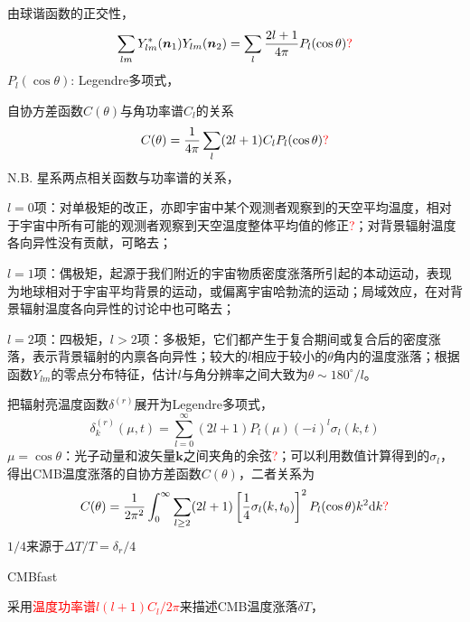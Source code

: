 \documentclass[12pt,a4paper]{article}
\renewcommand{\vec}[1]{\boldsymbol{#1}}
\newcommand{\dif}{\mathrm{d}}
\begin{document}
由球谐函数的正交性，
\begin{equation}
\sum_{lm} Y^*_{lm}(\vec{n}_1) Y_{lm}(\vec{n}_2) = \sum_l \frac{2l+1}{4\pi} P_l (\cos \theta)\textcolor{red}{?}
\end{equation}
$P_l (\cos \theta)$: Legendre多项式，

自协方差函数$C(\theta)$与角功率谱$C_l$的关系
\begin{equation}
C(\theta) = \frac{1}{4\pi} \sum_l (2l+1) C_l P_l (\cos \theta)\textcolor{red}{?}
\end{equation}
N.B. 星系两点相关函数与功率谱的关系，

$l=0$项：对单极矩的改正，亦即宇宙中某个观测者观察到的天空平均温度，相对于宇宙中所有可能的观测者观察到天空温度整体平均值的修正\textcolor{red}{?}；对背景辐射温度各向异性没有贡献，可略去；

$l=1$项：偶极矩，起源于我们附近的宇宙物质密度涨落所引起的本动运动，表现为地球相对于宇宙平均背景的运动，或偏离宇宙哈勃流的运动；局域效应，在对背景辐射温度各向异性的讨论中也可略去；

$l=2$项：四极矩，$l>2$项：多极矩，它们都产生于复合期间或复合后的密度涨落，表示背景辐射的内禀各向异性；较大的$l$相应于较小的$\theta$角内的温度涨落；根据函数$Y_{lm}$的零点分布特征，估计$l$与角分辨率之间大致为$\theta \sim 180^{\circ}/l$。

把辐射亮温度函数$\delta^{(r)}$展开为Legendre多项式，
\begin{equation}
\delta_k^{(r)}(\mu, t) = \sum_{l=0}^{\infty} (2l +1) P_l(\mu) (-i)^l \sigma_l(k, t)
\end{equation}
$\mu = \cos \theta$：光子动量和波矢量$\vec{k}$之间夹角的余弦\textcolor{red}{?}；可以利用数值计算得到的$\sigma_l$，得出CMB温度涨落的自协方差函数$C(\theta)$，二者关系为
\begin{equation}
C(\theta) = \frac{1}{2\pi^2} \int_0^{\infty} \sum_{l \geq 2}(2l +1) \left[\frac{1}{4} \sigma_l(k,t_0) \right]^2 P_l(\cos \theta) k^2 \dif k\textcolor{red}{?}
\end{equation}
$1/4$来源于$\Delta T/T = \delta_r/4$

CMBfast

采用\textcolor{red}{温度功率谱$l(l+1)C_l/2\pi$}来描述CMB温度涨落$\delta T$，
\end{document}

